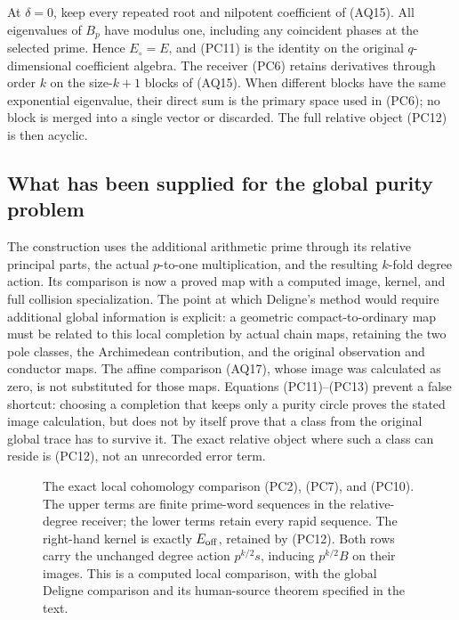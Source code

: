 At $\delta=0$, keep every repeated root and nilpotent coefficient of
(AQ15). All eigenvalues of $B_p$ have modulus one, including any
coincident phases at the selected prime. Hence $E_\circ=E$, and
(PC11) is the identity on the original $q$-dimensional coefficient
algebra. The receiver (PC6) retains derivatives through order $k$
on the size-$k+1$ blocks of (AQ15). When different blocks have the
same exponential eigenvalue, their direct sum is the primary space
used in (PC6); no block is merged into a single vector or discarded.
The full relative object (PC12) is then acyclic.

\subsection{What has been supplied for the global purity problem}
The construction uses the additional arithmetic prime through its
relative principal parts, the actual $p$-to-one multiplication, and
the resulting $k$-fold degree action. Its comparison is now a proved
map with a computed image, kernel, and full collision specialization.
The point at which Deligne's method would require additional global
information is explicit: a geometric compact-to-ordinary map must
be related to this local completion by actual chain maps, retaining
the two pole classes, the Archimedean contribution, and the original
observation and conductor maps. The affine comparison (AQ17), whose
image was calculated as zero, is not substituted for those maps.
Equations (PC11)--(PC13) prevent a false shortcut: choosing a
completion that keeps only a purity circle proves the stated image
calculation, but does not by itself prove that a class from the
original global trace has to survive it. The exact relative object
where such a class can reside is (PC12), not an unrecorded error term.

\begin{figure}[ht]
\centering
{}
\caption{The exact local cohomology comparison (PC2), (PC7), and
(PC10). The upper terms are finite prime-word sequences in the
relative-degree receiver; the lower terms retain every rapid sequence.
The right-hand kernel is exactly $E_{\rm off}$, retained by (PC12).
Both rows carry the unchanged degree action $p^{k/2}s$, inducing
$p^{k/2}B$ on their images. This is a computed local comparison,
with the global Deligne comparison and its human-source theorem
specified in the text.}
\end{figure}
